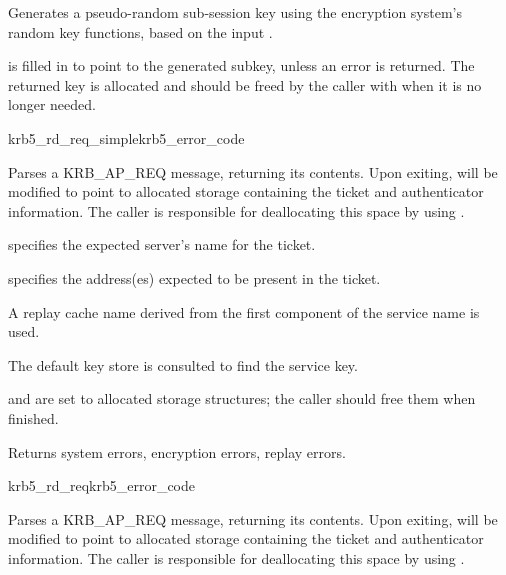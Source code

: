 Generates a pseudo-random sub-session key using the encryption system's
random key functions, based on the input .

 is filled in to point to the generated subkey, unless
an error is returned.  The returned key is allocated and should be freed
by the caller with  when it is no longer
needed.

\begin{funcdecl}{krb5_rd_req_simple}{krb5_error_code}{\funcin}
\funcout
{}
\end{funcdecl}

Parses a KRB_AP_REQ message, returning its contents.  Upon exiting,
 will be modified to point to allocated storage
containing the ticket and authenticator information.  The caller is
responsible for deallocating this space by using
.

 specifies the expected server's name for the ticket.

 specifies the address(es) expected to be present
in the ticket.

A replay cache name derived from the first component of the service name
is used.

The default key store is consulted to find the service key.

 and
 are set to allocated storage
structures; the caller should free them when finished.

Returns system errors, encryption errors, replay errors.


\begin{funcdecl}{krb5_rd_req}{krb5_error_code}{\funcin}
\funcendfuncarg
{}
\funcinout
{}
\funcout
{}
\end{funcdecl}

Parses a KRB_AP_REQ message, returning its contents.  Upon exiting,
 will be modified to point to allocated storage
containing the ticket and authenticator information.  The caller is
responsible for deallocating this space by using
.

